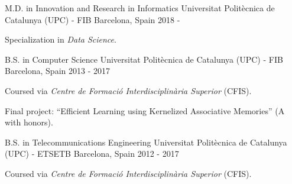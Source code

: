 
\begin{cventries}

\cventry
  {M.D. in Innovation and Research in Informatics}
  {Universitat Polit\`ecnica de Catalunya (UPC) - FIB}
  {Barcelona, Spain}
  {2018 - }
  {
    \begin{cvitems}
      \item {Specialization in \textit{Data Science}.}
    \end{cvitems}
  }

\cventry
  {B.S. in Computer Science}
  {Universitat Polit\`ecnica de Catalunya (UPC) - FIB}
  {Barcelona, Spain}
  {2013 - 2017}
  {
    \begin{cvitems}
      \item {Coursed via \textit{Centre de Formaci\'o Interdisciplin\`aria Superior} (CFIS).}
      \item {Final project: ``Efficient Learning using Kernelized Associative Memories'' (A with honors).}
    \end{cvitems}
  }

\cventry
  {B.S. in Telecommunications Engineering}
  {Universitat Polit\`ecnica de Catalunya (UPC) - ETSETB}
  {Barcelona, Spain}
  {2012 - 2017}
  {
    \begin{cvitems}
      \item {Coursed via \textit{Centre de Formaci\'o Interdisciplin\`aria Superior} (CFIS).}
    \end{cvitems}
  }

\end{cventries}
